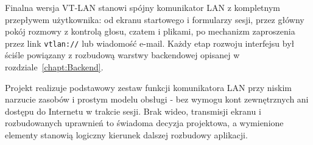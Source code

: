 Finalna wersja VT-LAN stanowi spójny komunikator LAN z kompletnym
przepływem użytkownika: od ekranu startowego i formularzy sesji, przez
główny pokój rozmowy z kontrolą głosu, czatem i plikami, po mechanizm
zaproszenia przez link \texttt{vtlan://} lub wiadomość e-mail.
Każdy etap rozwoju interfejsu był ściśle powiązany z rozbudową warstwy
backendowej opisanej w rozdziale~\ref{chapt:Backend}.

Projekt realizuje podstawowy zestaw funkcji komunikatora LAN przy niskim
narzucie zasobów i prostym modelu obsługi - bez wymogu kont zewnętrznych
ani dostępu do Internetu w trakcie sesji. Brak wideo, transmisji ekranu
i rozbudowanych uprawnień to świadoma decyzja projektowa, a wymienione
elementy stanowią logiczny kierunek dalszej rozbudowy aplikacji.

\flushbottom 